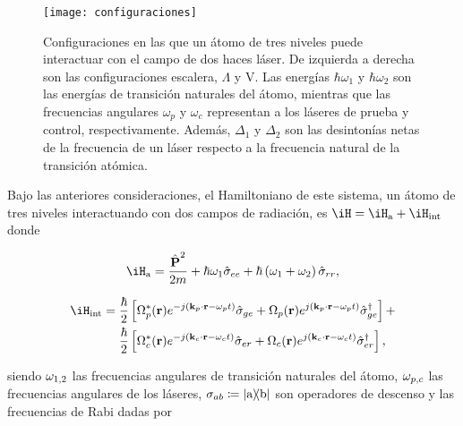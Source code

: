 \begin{figure}[H]
\centering
\begin{minipage}{0.8\textwidth}
\centering
\texttt{[image: configuraciones]}
\caption{\label{fig:configuraciones}Configuraciones en las que un átomo de tres niveles puede interactuar con el campo de dos haces láser. De izquierda a derecha son las configuraciones escalera, $\Lambda$ y V. Las energías $\hbar\omega_{1}$ y $\hbar\omega_{2}$ son las energías de transición naturales del átomo, mientras que las frecuencias angulares $\omega_{p}$ y $\omega_{c}$ representan a los láseres de prueba y control, respectivamente. Además, $\Delta_{1}$ y $\Delta_{2}$ son las desintonías netas de la frecuencia de un láser respecto a la frecuencia natural de la transición atómica.}
\end{minipage}
\end{figure}

Bajo las anteriores consideraciones, el Hamiltoniano de este sistema, un átomo de tres niveles interactuando con dos campos de radiación, es $\iH=\iH_\sm{\mathrm{a}}+\iH_\sm{\mathrm{int}}$ donde

\begin{equation}
\label{ec:hamiltonianoAtomico}
\iH_\sm{\mathrm{a}}=\dfrac{\hat{\vektor{P}}^{2}}{2m}+\hbar\omega_\sm{1}\hat{\sigma}_\sm{ee}+\hbar\left(\omega_\sm{1}+\omega_\sm{2}\right)\hat{\sigma}_\sm{rr},
\end{equation}

\begin{equation}
\label{ec:hamiltonianoInteraccion}
\begin{split}
\iH_\sm{\mathrm{int}}= & \hspace{1mm}\dfrac{\hbar}{2}\left[\Omega^{*}_\sm{p}(\vektor{r})e^{-j\left(\vektor{k}_{p}\cdot\vektor{r}-\omega_{p}t\right)}\hat{\sigma}_\sm{ge}+\Omega_\sm{p}(\vektor{r})e^{j\left(\vektor{k}_{p}\cdot\vektor{r}-\omega_{p}t\right)}\hat{\sigma}_\sm{ge}^{\dagger}\right]+\\
& \hspace{1mm}\dfrac{\hbar}{2}\left[\Omega^{*}_\sm{c}(\vektor{r})e^{-j\left(\vektor{k}_{c}\cdot\vektor{r}-\omega_{c}t\right)}\hat{\sigma}_\sm{er}+\Omega_\sm{c}(\vektor{r})e^{j\left(\vektor{k}_{c}\cdot\vektor{r}-\omega_{c}t\right)}\hat{\sigma}_\sm{er}^{\dagger}\right],
\end{split}
\end{equation}

siendo $\omega_{1,2}$ las frecuencias angulares de transición naturales del átomo, $\omega_{p,c}$ las frecuencias angulares de los láseres, $\sigma_{ab}\coloneqq\ketbra{a}{b}$ son operadores de descenso y las frecuencias de Rabi dadas por

